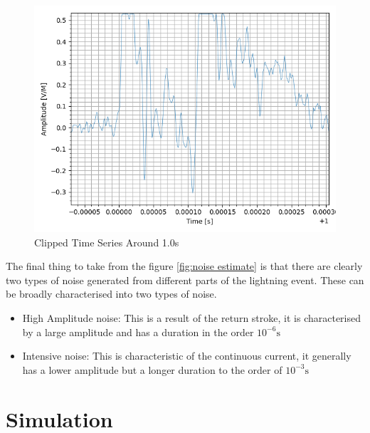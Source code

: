 \begin{figure}[h!]
    \centering
    \includegraphics[width = \textwidth]{figs/sig_character/Clipping.png}
    \caption{Clipped Time Series Around 1.0s}
    \label{fig:clipping}
\end{figure}

The final thing to take from the figure \ref{fig:noise estimate} is that there are clearly two types of noise generated from different parts of the lightning event. These can be broadly characterised into two types of noise.
\begin{itemize}
    \item High Amplitude noise: This is a result of the return stroke, it is characterised by a large amplitude and has a duration in the order $10^{-6}\si{\second}$ 
    \item Intensive noise: This is characteristic of the continuous current, it generally has a lower amplitude but a longer duration to the order of $10^{-3}\si{\second}$

\end{itemize}

\pagebreak
\section{Simulation}

